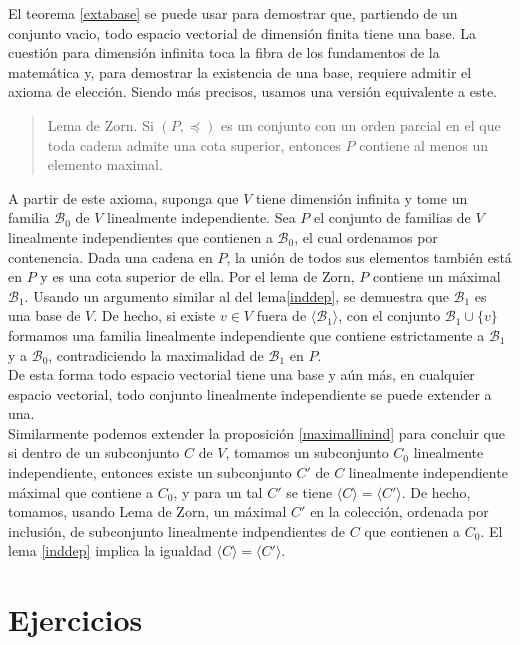 \begin{obs}\label{basesinfty}
El teorema \ref{extabase} se puede usar para demostrar que, partiendo de un conjunto vacio, todo espacio vectorial de dimensi\'on finita tiene una base. La cuesti\'on para dimensi\'on infinita toca la fibra de los fundamentos de la matem\'atica y, para demostrar la existencia de una base, requiere admitir el axioma de elecci\'on. Siendo m\'as precisos, usamos una versi\'on equivalente a este.
\begin{quote}
Lema de Zorn. Si $(P,\preccurlyeq)$ es un conjunto con un orden parcial en el que toda cadena admite una cota superior, entonces $P$ contiene al menos un elemento maximal.
\end{quote}
A partir de este axioma, suponga que $V$ tiene dimensi\'on infinita y tome un familia $\mathcal{B}_0$ de $V$ linealmente independiente. Sea $P$ el conjunto de familias de $V$ linealmente independientes que contienen a $\mathcal{B}_0$, el cual ordenamos por contenencia. Dada una cadena en $P$, la uni\'on de todos sus elementos tambi\'en est\'a en $P$ y es una cota superior de ella. Por el lema de Zorn, $P$ contiene un m\'aximal $\mathcal{B}_1$. Usando un argumento similar al del lema\ref{inddep}, se demuestra que $\mathcal{B}_1$ es una base de $V$. De hecho, si existe $v\in V$ fuera de $\langle \mathcal{B}_1\rangle$, con el conjunto $\mathcal{B}_1\cup\{v\}$ formamos una familia linealmente independiente que contiene estrictamente a $\mathcal{B}_1$ y a $\mathcal{B}_0$, contradiciendo la maximalidad de $\mathcal{B}_1$ en $P$.\\
De esta forma todo espacio vectorial tiene una base y a\'un m\'as, en cualquier espacio vectorial, todo conjunto linealmente independiente se puede extender a una.\\
Similarmente podemos extender la proposici\'on \ref{maximallinind} para concluir que si dentro de un subconjunto $C$ de $V$, tomamos un subconjunto $C_0$ linealmente independiente, entonces existe un subconjunto $C'$ de $C$ linealmente independiente m\'aximal que contiene a $C_0$, y para un tal $C'$ se tiene $\langle C\rangle=\langle C'\rangle$. De hecho, tomamos, usando Lema de Zorn, un m\'aximal $C'$ en la colecci\'on, ordenada por inclusi\'on, de subconjunto linealmente indpendientes de $C$ que contienen a $C_0$. El lema \ref{inddep} implica la igualdad $\langle C\rangle=\langle C'\rangle$.
\end{obs}

\section*{Ejercicios}


